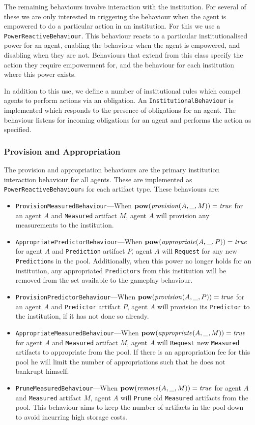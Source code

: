 The remaining behaviours involve interaction with the institution.
For several of these we are only interested in triggering the behaviour when
the agent is empowered to do a particular action in an institution. For this
we use a \texttt{PowerReactiveBehaviour}. This behaviour reacts to a
particular institutionalised power for an agent, enabling the behaviour when
the agent is empowered, and disabling when they are not. Behaviours that extend
from this class specify the action they require empowerment for, and the
behaviour for each institution where this power exists.

In addition to this use, we define a number of institutional rules which
compel agents to perform actions via an obligation. An
\texttt{InstitutionalBehaviour} is implemented which responds to the presence of obligations
for an agent. The behaviour listens for incoming obligations for an agent and
performs the action as specified. 

\subsubsection*{Provision and Appropriation}

The provision and appropriation behaviours are the primary institution
interaction behaviour for all agents. These are implemented as
\texttt{PowerReactiveBehaviour}s for each artifact type. These behaviours are:

\begin{itemize}
\item \texttt{ProvisionMeasuredBehaviour}---When $\mathbf{pow}(\mathit{provision}(A,\_,M)) = \mathit{true}$ for an agent $A$ and \texttt{Measured} artifact $M$, agent $A$ will provision any measurements to the institution.
\item \texttt{AppropriatePredictorBehaviour}---When $\mathbf{pow}(\mathit{appropriate}(A,\_,P)) = \mathit{true}$ for agent $A$ and \texttt{Prediction} artifact $P$, agent $A$ will \texttt{Request} for any new \texttt{Prediction}s in the pool. Additionally, when this power no longer holds for an institution, any appropriated \texttt{Predictors} from this institution will be removed from the set available to the gameplay behaviour.
\item \texttt{ProvisionPredictorBehaviour}---When $\mathbf{pow}(\mathit{provision}(A,\_,P)) = \mathit{true}$ for an agent $A$ and \texttt{Predictor} artifact $P$, agent $A$ will provision its \texttt{Predictor} to the institution, if it has not done so already.
\item \texttt{AppropriateMeasuredBehaviour}---When $\mathbf{pow}(\mathit{appropriate}(A,\_,M)) = \mathit{true}$ for agent $A$ and \texttt{Measured} artifact $M$, agent $A$ will \texttt{Request} new \texttt{Measured} artifacts to appropriate from the pool. If there is an appropriation fee for this pool he will limit the number of appropriations such that he does not bankrupt himself.
\item \texttt{PruneMeasuredBehaviour}---When $\mathbf{pow}(\mathit{remove}(A,\_,M)) = \mathit{true}$ for agent $A$ and \texttt{Measured} artifact $M$, agent $A$ will \texttt{Prune} old \texttt{Measured} artifacts from the pool. This behaviour aims to keep the number of artifacts in the pool down to avoid incurring high storage costs.
\end{itemize}


